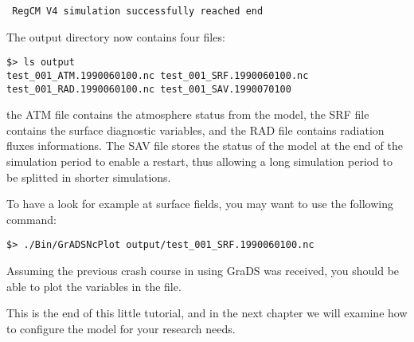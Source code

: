 \begin{Verbatim}
 RegCM V4 simulation successfully reached end
\end{Verbatim}

The output directory now contains four files:

\begin{Verbatim}
$> ls output
test_001_ATM.1990060100.nc test_001_SRF.1990060100.nc
test_001_RAD.1990060100.nc test_001_SAV.1990070100
\end{Verbatim}

the ATM file contains the atmosphere status from the model, the SRF file
contains the surface diagnostic variables, and the RAD file contains radiation
fluxes informations. The SAV file stores the status of the model at the end of
the simulation period to enable a restart, thus allowing a long simulation
period to be splitted in shorter simulations.

To have a look for example at surface fields, you may want to use the
following command:

\begin{Verbatim}
$> ./Bin/GrADSNcPlot output/test_001_SRF.1990060100.nc
\end{Verbatim}

Assuming the previous crash course in using GraDS was received, you should be
able to plot the variables in the file.

This is the end of this little tutorial, and in the next chapter we will
examine how to configure the model for your research needs.

